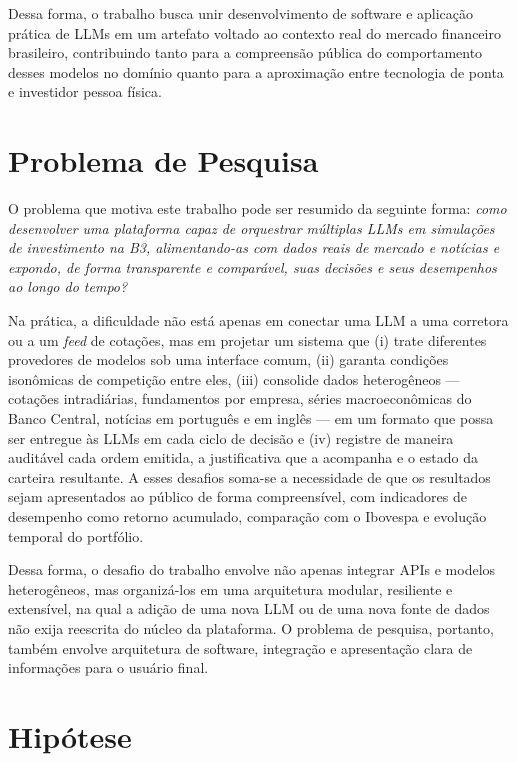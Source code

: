 \documentclass[portuguese]{sbcreviews-2025}
\begin{document}
Dessa forma, o trabalho busca unir desenvolvimento de software e aplicação prática de LLMs em um artefato voltado ao contexto real do mercado financeiro brasileiro, contribuindo tanto para a compreensão pública do comportamento desses modelos no domínio quanto para a aproximação entre tecnologia de ponta e investidor pessoa física.

\section{Problema de Pesquisa}

O problema que motiva este trabalho pode ser resumido da seguinte forma: \textit{como desenvolver uma plataforma capaz de orquestrar múltiplas LLMs em simulações de investimento na B3, alimentando-as com dados reais de mercado e notícias e expondo, de forma transparente e comparável, suas decisões e seus desempenhos ao longo do tempo?}

Na prática, a dificuldade não está apenas em conectar uma LLM a uma corretora ou a um \textit{feed} de cotações, mas em projetar um sistema que (i) trate diferentes provedores de modelos sob uma interface comum, (ii) garanta condições isonômicas de competição entre eles, (iii) consolide dados heterogêneos --- cotações intradiárias, fundamentos por empresa, séries macroeconômicas do Banco Central, notícias em português e em inglês --- em um formato que possa ser entregue às LLMs em cada ciclo de decisão e (iv) registre de maneira auditável cada ordem emitida, a justificativa que a acompanha e o estado da carteira resultante. A esses desafios soma-se a necessidade de que os resultados sejam apresentados ao público de forma compreensível, com indicadores de desempenho como retorno acumulado, comparação com o Ibovespa e evolução temporal do portfólio.

Dessa forma, o desafio do trabalho envolve não apenas integrar APIs e modelos heterogêneos, mas organizá-los em uma arquitetura modular, resiliente e extensível, na qual a adição de uma nova LLM ou de uma nova fonte de dados não exija reescrita do núcleo da plataforma. O problema de pesquisa, portanto, também envolve arquitetura de software, integração e apresentação clara de informações para o usuário final.

\section{Hipótese}
\end{document}
